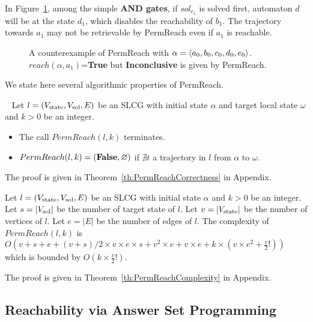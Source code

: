 \begin{example}\label{ex:counterPerm}
In Figure~\ref{FigConflictInForks}, among the simple \textbf{AND gates}, if $sol_{c_1}$ is solved first, automaton $d$ will be at the state $d_1$, which disables the reachability of $b_1$.
The trajectory towards $a_1$ may not be retrievable by PermReach even if $a_1$ is reachable.
\end{example}

\begin{figure}[ht]
\centering

\caption[Counterexample of PermReach]{A counterexample of PermReach with $\alpha=\langle a_0,b_0,c_0,d_0,e_0\rangle$. 
$reach(\alpha,a_1)$=\textbf{True} but \textbf{Inconclusive} is given by PermReach.
}\label{FigConflictInForks}
\end{figure}

We state here several algorithmic properties of PermReach.

\begin{theorem}~
    Let $l=(V_{\mathrm{state}}, V_{\mathrm{sol}}, E)$ be an SLCG with initial state $\alpha$ and target local state $\omega$ and $k > 0$ be an integer.
    \begin{itemize}
        \item The call $PermReach(l,k)$ terminates.
        \item $PermReach(l,k)=(\mathbf{False},\varnothing)$ if $\nexists t$ a trajectory in $l$ from $\alpha$ to $\omega$.
    \end{itemize}
    
    The proof is given in Theorem~\ref{th:PermReachCorrectness} in Appendix.
\end{theorem}

\begin{theorem}
    Let $l=(V_{\mathrm{state}},V_{\mathrm{sol}}, E)$ be an SLCG with initial state $\alpha$ and $k > 0$ be an integer.
    Let $s=|V_{\mathrm{sol}}|$ be the number of target state of $l$.
    Let $v = |V_{\mathrm{state}}|$ be the number of vertices of $l$.
    Let $e=|E|$ be the number of edges of $l$.
    The complexity of $PermReach(l,k)$ is $O(v + s + e + (v+s) / 2 \times v \times e \times s + v^{2} \times e + v \times e + k \times (v \times e^{2} + \frac{v}{2}!))$ which is bounded by $O(k \times \frac{v}{2}!)$.
    
    The proof is given in Theorem~\ref{th:PermReachComplexity} in Appendix.
\end{theorem}

\subsection{Reachability via Answer Set Programming}\label{sec:aspreach}

